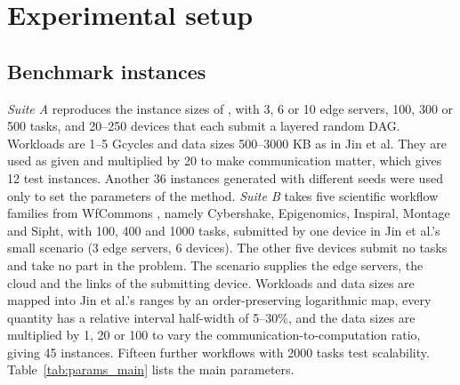 \section{Experimental setup}
\label{sec:experiments}
\label{sec:setup}

\subsection{Benchmark instances}
\emph{Suite A} reproduces the instance sizes of \citet{jin2026imoeadqn}, with 3, 6 or 10 edge servers, 100, 300 or 500
tasks, and 20--250 devices that each submit a layered random DAG. Workloads are 1--5 Gcycles and data sizes 500--3000 KB
as in Jin et al. They are used as given and multiplied by 20 to make communication matter, which gives 12 test
instances. Another 36 instances generated with different seeds were used only to set the parameters of the method. \emph{Suite B} takes five
scientific workflow families from WfCommons \citep{coleman2022wfcommons}, namely Cybershake, Epigenomics, Inspiral,
Montage and Sipht, with 100, 400 and 1000 tasks, submitted by one device in Jin et al.'s small scenario (3 edge servers,
6 devices). The other five devices submit no tasks and take no part in the problem. The scenario supplies the edge
servers, the cloud and the links of the submitting device. Workloads and data sizes are mapped into Jin et al.'s ranges by an order-preserving logarithmic map, every
quantity has a relative interval half-width of 5--30\%, and the data sizes are multiplied by 1, 20 or 100 to vary the
communication-to-computation ratio, giving 45 instances. Fifteen further workflows with 2000 tasks test scalability.
Table~\ref{tab:params_main} lists the main parameters.



